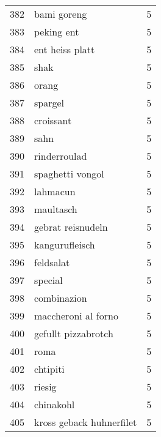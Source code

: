 \begin{tabular}{llr}
382  &                                        bami goreng &      5 \\
383  &                                         peking ent &      5 \\
384  &                                    ent heiss platt &      5 \\
385  &                                               shak &      5 \\
386  &                                              orang &      5 \\
387  &                                            spargel &      5 \\
388  &                                          croissant &      5 \\
389  &                                               sahn &      5 \\
390  &                                       rinderroulad &      5 \\
391  &                                   spaghetti vongol &      5 \\
392  &                                           lahmacun &      5 \\
393  &                                          maultasch &      5 \\
394  &                                  gebrat reisnudeln &      5 \\
395  &                                     kangurufleisch &      5 \\
396  &                                          feldsalat &      5 \\
397  &                                            special &      5 \\
398  &                                        combinazion &      5 \\
399  &                                maccheroni al forno &      5 \\
400  &                                gefullt pizzabrotch &      5 \\
401  &                                               roma &      5 \\
402  &                                           chtipiti &      5 \\
403  &                                             riesig &      5 \\
404  &                                          chinakohl &      5 \\
405  &                           kross geback huhnerfilet &      5 \\

\end{tabular}
